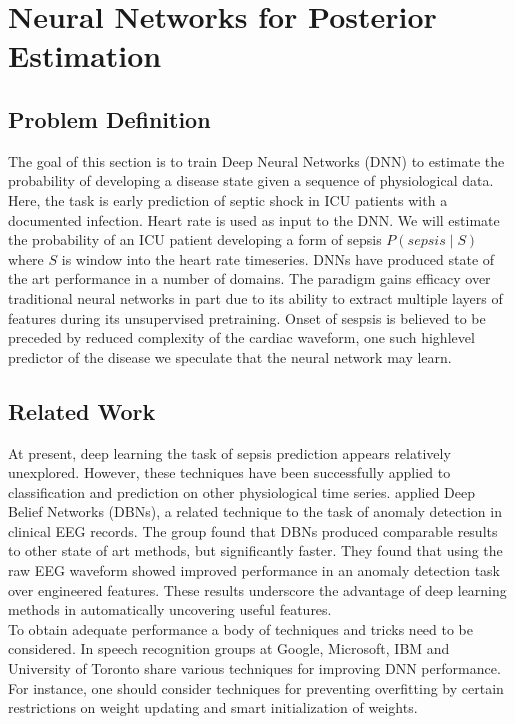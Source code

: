 \documentclass[12pt,solutions]{article}
\begin{document}
\section{Neural Networks for Posterior Estimation}

\subsection{Problem Definition}
The goal of this section is to train Deep Neural Networks (DNN) to estimate the probability of developing a disease state given a sequence of
physiological data. Here, the task is early prediction of septic shock in ICU patients with a documented infection. Heart rate is used as input to
the DNN. We will estimate the probability of an ICU patient developing a form of sepsis $P(sepsis \mid S)$ where $S$ is window into the 
heart rate timeseries. DNNs have produced state of the art performance in a number of domains. The paradigm gains efficacy over traditional neural networks in part due to its ability to extract multiple layers of features during its unsupervised pretraining. Onset of sespsis is believed to be preceded by reduced complexity of the cardiac waveform, one such highlevel predictor of the disease we speculate that the neural network may learn. 

\subsection{Related Work}

At present, deep learning the task of sepsis prediction appears relatively unexplored. However, these techniques have been successfully applied to classification and prediction on other physiological time series. \cite{wulsin2011modeling} applied Deep Belief Networks (DBNs), a related technique to the task of anomaly detection in clinical EEG records. The group found that 
DBNs produced comparable results to other state of art methods, but significantly faster. They found
that using the raw EEG waveform showed improved performance in an
anomaly detection task over engineered features.
These results underscore the advantage of deep learning methods in 
automatically uncovering useful features. \\

To obtain adequate performance a body of techniques and tricks need to be considered. In \cite{hinton2012deep} speech recognition groups at Google, Microsoft, IBM and University of Toronto share various techniques for improving DNN performance. For instance, one should consider techniques for
preventing overfitting by certain restrictions on weight updating and smart initialization of weights.
\end{document}
